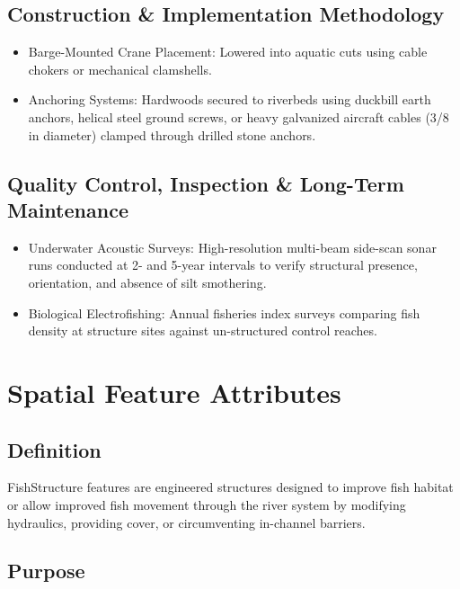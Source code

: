 \documentclass[
  letterpaper,
  DIV=11,
  numbers=noendperiod]{scrreprt}
\begin{document}
\subsection{Construction \& Implementation
Methodology}\label{construction-implementation-methodology-3}

\begin{itemize}
\item
  Barge-Mounted Crane Placement: Lowered into aquatic cuts using cable
  chokers or mechanical clamshells.
\item
  Anchoring Systems: Hardwoods secured to riverbeds using duckbill earth
  anchors, helical steel ground screws, or heavy galvanized aircraft
  cables (3/8 in diameter) clamped through drilled stone anchors.
\end{itemize}

\subsection{Quality Control, Inspection \& Long-Term
Maintenance}\label{quality-control-inspection-long-term-maintenance-3}

\begin{itemize}
\item
  Underwater Acoustic Surveys: High-resolution multi-beam side-scan
  sonar runs conducted at 2- and 5-year intervals to verify structural
  presence, orientation, and absence of silt smothering.
\item
  Biological Electrofishing: Annual fisheries index surveys comparing
  fish density at structure sites against un-structured control reaches.
\end{itemize}

\section{Spatial Feature Attributes}\label{spatial-feature-attributes}

\subsection{Definition}\label{definition-3}

FishStructure features are engineered structures designed to improve
fish habitat or allow improved fish movement through the river system by
modifying hydraulics, providing cover, or circumventing in-channel
barriers.

\subsection{Purpose}\label{purpose-5}
\end{document}

